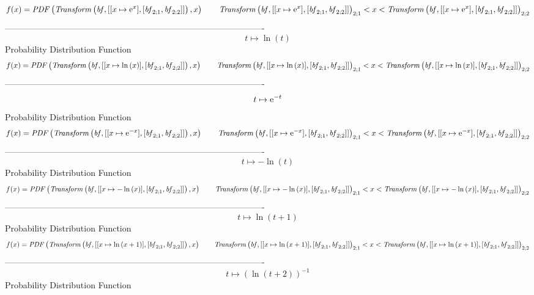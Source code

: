 \documentclass[12pt]{article}
\begin{document}
$$  f(x)={\it PDF} \left( {\it Transform} \left( {\it bf},[[x\mapsto {{\rm e}^{
x}}],[{\it bf}_{2;{1}},{\it bf}_{2;{2}}]] \right) ,x \right) 
 \qquad{\it Transform} \left( {\it bf},[[x\mapsto {{\rm e}^{x}}],[{\it bf}_{2
;{1}},{\it bf}_{2;{2}}]] \right) _{2;{1}}
 < x < {\it Transform} \left( {\it bf},[[x\mapsto {{\rm e}^{x}}],[{\it bf}_{2
;{1}},{\it bf}_{2;{2}}]] \right) _{2;{2}}
$$-------------------------------------------------------------------------------------------  \\$$t\mapsto \ln  \left( t \right) 
$$Probability Distribution Function 
$$  f(x)={\it PDF} \left( {\it Transform} \left( {\it bf},[[x\mapsto \ln 
 \left( x \right) ],[{\it bf}_{2;{1}},{\it bf}_{2;{2}}]] \right) ,x
 \right) 
 \qquad{\it Transform} \left( {\it bf},[[x\mapsto \ln  \left( x \right) ],[{
\it bf}_{2;{1}},{\it bf}_{2;{2}}]] \right) _{2;{1}}
 < x < {\it Transform} \left( {\it bf},[[x\mapsto \ln  \left( x \right) ],[{
\it bf}_{2;{1}},{\it bf}_{2;{2}}]] \right) _{2;{2}}
$$-------------------------------------------------------------------------------------------  \\$$t\mapsto {{\rm e}^{-t}}
$$Probability Distribution Function 
$$  f(x)={\it PDF} \left( {\it Transform} \left( {\it bf},[[x\mapsto {{\rm e}^{
-x}}],[{\it bf}_{2;{1}},{\it bf}_{2;{2}}]] \right) ,x \right) 
 \qquad{\it Transform} \left( {\it bf},[[x\mapsto {{\rm e}^{-x}}],[{\it bf}_{
2;{1}},{\it bf}_{2;{2}}]] \right) _{2;{1}}
 < x < {\it Transform} \left( {\it bf},[[x\mapsto {{\rm e}^{-x}}],[{\it bf}_{
2;{1}},{\it bf}_{2;{2}}]] \right) _{2;{2}}
$$-------------------------------------------------------------------------------------------  \\$$t\mapsto -\ln  \left( t \right) 
$$Probability Distribution Function 
$$  f(x)={\it PDF} \left( {\it Transform} \left( {\it bf},[[x\mapsto -\ln 
 \left( x \right) ],[{\it bf}_{2;{1}},{\it bf}_{2;{2}}]] \right) ,x
 \right) 
 \qquad{\it Transform} \left( {\it bf},[[x\mapsto -\ln  \left( x \right) ],[{
\it bf}_{2;{1}},{\it bf}_{2;{2}}]] \right) _{2;{1}}
 < x < {\it Transform} \left( {\it bf},[[x\mapsto -\ln  \left( x \right) ],[{
\it bf}_{2;{1}},{\it bf}_{2;{2}}]] \right) _{2;{2}}
$$-------------------------------------------------------------------------------------------  \\$$t\mapsto \ln  \left( t+1 \right) 
$$Probability Distribution Function 
$$  f(x)={\it PDF} \left( {\it Transform} \left( {\it bf},[[x\mapsto \ln 
 \left( x+1 \right) ],[{\it bf}_{2;{1}},{\it bf}_{2;{2}}]] \right) ,x
 \right) 
 \qquad{\it Transform} \left( {\it bf},[[x\mapsto \ln  \left( x+1 \right) ],[
{\it bf}_{2;{1}},{\it bf}_{2;{2}}]] \right) _{2;{1}}
 < x < {\it Transform} \left( {\it bf},[[x\mapsto \ln  \left( x+1 \right) ],[
{\it bf}_{2;{1}},{\it bf}_{2;{2}}]] \right) _{2;{2}}
$$-------------------------------------------------------------------------------------------  \\$$t\mapsto  \left( \ln  \left( t+2 \right)  \right) ^{-1}
$$Probability Distribution Function 
\end{document}
